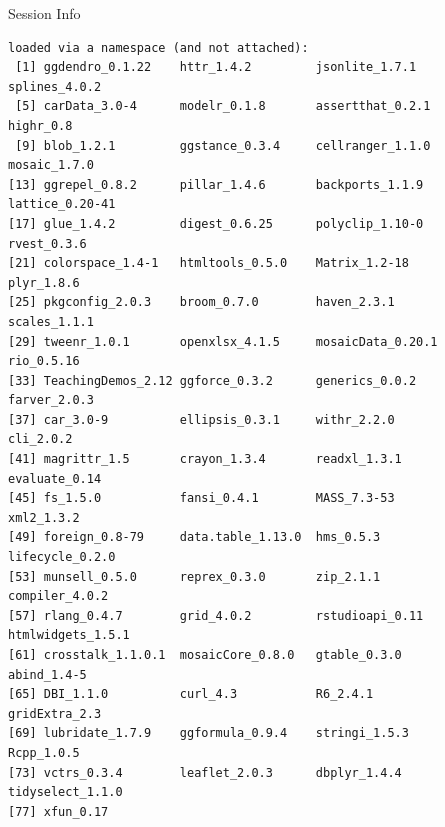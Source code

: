 \documentclass[10pt]{beamer}\usepackage[]{graphicx}\usepackage[]{color}
\makeatletter
\newenvironment{kframe}{%
 \def\at@end@of@kframe{}%
 \ifinner\ifhmode%
  \def\at@end@of@kframe{\end{minipage}}%
  \begin{minipage}{\columnwidth}%
 \fi\fi%
 \def\FrameCommand##1{\hskip\@totalleftmargin \hskip-\fboxsep
 \colorbox{shadecolor}{##1}\hskip-\fboxsep
     \hskip-\linewidth \hskip-\@totalleftmargin \hskip\columnwidth}%
 \MakeFramed {\advance\hsize-\width
   \@totalleftmargin\z@ \linewidth\hsize
   \@setminipage}}%
 {\par\unskip\endMakeFramed%
 \at@end@of@kframe}
\newenvironment{knitrout}{}{} %
\makeatother
\begin{document}
\begin{frame}[fragile]{Session Info}
\begin{knitrout}
\begin{kframe}
\begin{verbatim}
loaded via a namespace (and not attached):
 [1] ggdendro_0.1.22    httr_1.4.2         jsonlite_1.7.1     splines_4.0.2     
 [5] carData_3.0-4      modelr_0.1.8       assertthat_0.2.1   highr_0.8         
 [9] blob_1.2.1         ggstance_0.3.4     cellranger_1.1.0   mosaic_1.7.0      
[13] ggrepel_0.8.2      pillar_1.4.6       backports_1.1.9    lattice_0.20-41   
[17] glue_1.4.2         digest_0.6.25      polyclip_1.10-0    rvest_0.3.6       
[21] colorspace_1.4-1   htmltools_0.5.0    Matrix_1.2-18      plyr_1.8.6        
[25] pkgconfig_2.0.3    broom_0.7.0        haven_2.3.1        scales_1.1.1      
[29] tweenr_1.0.1       openxlsx_4.1.5     mosaicData_0.20.1  rio_0.5.16        
[33] TeachingDemos_2.12 ggforce_0.3.2      generics_0.0.2     farver_2.0.3      
[37] car_3.0-9          ellipsis_0.3.1     withr_2.2.0        cli_2.0.2         
[41] magrittr_1.5       crayon_1.3.4       readxl_1.3.1       evaluate_0.14     
[45] fs_1.5.0           fansi_0.4.1        MASS_7.3-53        xml2_1.3.2        
[49] foreign_0.8-79     data.table_1.13.0  hms_0.5.3          lifecycle_0.2.0   
[53] munsell_0.5.0      reprex_0.3.0       zip_2.1.1          compiler_4.0.2    
[57] rlang_0.4.7        grid_4.0.2         rstudioapi_0.11    htmlwidgets_1.5.1 
[61] crosstalk_1.1.0.1  mosaicCore_0.8.0   gtable_0.3.0       abind_1.4-5       
[65] DBI_1.1.0          curl_4.3           R6_2.4.1           gridExtra_2.3     
[69] lubridate_1.7.9    ggformula_0.9.4    stringi_1.5.3      Rcpp_1.0.5        
[73] vctrs_0.3.4        leaflet_2.0.3      dbplyr_1.4.4       tidyselect_1.1.0  
[77] xfun_0.17         
\end{verbatim}
\end{kframe}
\end{knitrout}
	
\end{frame}
\end{document}
